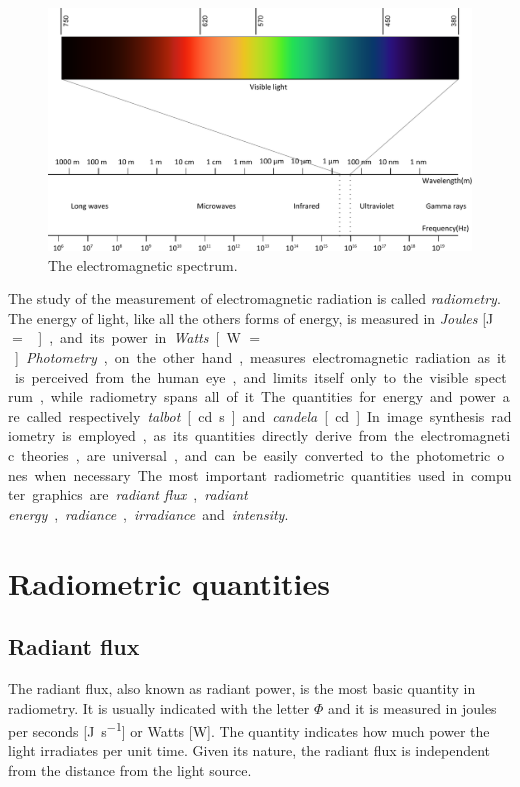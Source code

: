 \begin{figure}[!ht]
\centering
\includegraphics[width=1.0\textwidth]{images/spectrum.pdf}
\caption{The electromagnetic spectrum.}
\label{fig:spectrum}
\end{figure}

The study of the measurement of electromagnetic radiation is called \emph{radiometry}. The energy of light, like all the others forms of energy, is measured in \emph{Joules} [\si{\joule} $=$ \si{\kg\meter\square\per\second\square}], and its power in \emph{Watts} [\si{\watt} $=$ \si{\kg\meter\square\per\second\cubed}]. \emph{Photometry}, on the other hand, measures electromagnetic radiation as it is perceived from the human eye, and limits itself only to the visible spectrum, while radiometry spans all of it. The quantities for energy and power are called respectively \emph{talbot} [\si{\candela\second}] and \emph{candela} [\si{\candela}]. 

In image synthesis radiometry is employed, as its quantities directly derive from the electromagnetic theories, are universal, and can be easily converted to the photometric ones when necessary. The most important radiometric quantities used in computer graphics are \emph{radiant flux}, \emph{radiant energy}, \emph{radiance}, \emph{irradiance} and \emph{intensity}.

\section{Radiometric quantities}

\subsection{Radiant flux}
The radiant flux, also known as radiant power, is the most basic quantity in radiometry. It is usually indicated with the letter $\Phi$ and it is measured in joules per seconds [\si{\joule\per\second}] or Watts [\si{\watt}]. The quantity indicates how much power the light irradiates per unit time. Given its nature, the radiant flux is independent from the distance from the light source.

